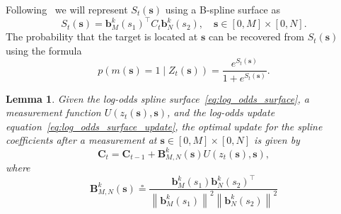 \documentclass{article}
\newtheorem{lemma}[theorem]{Lemma}
\newcommand{\norm}[1]{\left\|{#1}\right\|}
\newcommand{\defeq}{\circeq}
\newcommand{\bbf}{\mathbf{b}}
\newcommand{\sbf}{\mathbf{s}}
\newcommand{\Cbf}{\mathbf{C}}
\begin{document}
Following~\cite{RodriguesTsiogkasAguiar20} we will represent $S_t(\sbf)$ using a B-spline surface as 
\begin{equation}\label{eq:log_odds_surface}
S_t(\sbf) = \bbf_M^k(s_1)^\top C_t \bbf_N^k(s_2), \quad \sbf \in [0,M]\times[0,N].
\end{equation}
The probability that the target is located at $\sbf$ can be recovered from $S_t(\sbf)$ using the formula
\[
p(m(\sbf)=1\mid Z_t(\sbf)) = \frac{e^{S_t(\sbf)}}{1+e^{S_t(\sbf)}}.
\]

\begin{lemma}\label{lem:measurement_update_equation}
	Given the log-odds spline surface~\eqref{eq:log_odds_surface}, a measurement function $U(z_t(\sbf), \sbf)$, and the log-odds update equation~\eqref{eq:log_odds_surface_update}, the optimal update for the spline coefficients after a measurement at $\sbf \in [0,M]\times[0,N]$ is given by
	\begin{equation}\label{eq:coefficient_update_3}
	\Cbf_t = \Cbf_{t-1} + \mathbf{B}_{M,N}^k(\sbf) U(z_t(\sbf), \sbf), 
	\end{equation}
	where
	\begin{equation}\label{eq:measurement_update_matrix_B}
	\mathbf{B}_{M,N}^k(\sbf) \defeq \frac{\bbf_M^k(s_1)\bbf_N^k(s_2)^\top}{\norm{\bbf_M^k(s_1)}^2\norm{\bbf_N^k(s_2)}^2}
	\end{equation}
\end{lemma}
\end{document}
